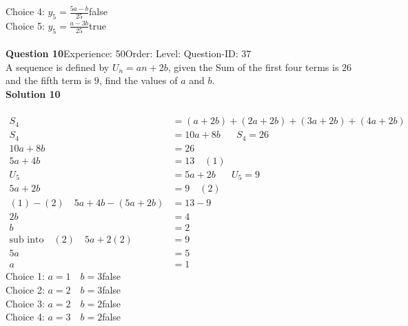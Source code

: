 \documentclass{article}
\begin{document}
Choice 4: \hspace{20pt}$y_5=\displaystyle\frac{5a-b}{25}$\hspace{20pt}false\\
Choice 5: \hspace{20pt}$y_5=\displaystyle\frac{a-3b}{25}$\hspace{20pt}true\\
\\[4pt]
\noindent\textbf{Question 10}\hspace{20pt}Experience: 50\hspace{20pt}Order: \hspace{20pt}Level: \hspace{20pt}Question-ID: 37\\[2pt]
A sequence is defined by $U_n=an+2b$, given the Sum of the first four terms is $26$ and the fifth term is $9$, find the values of $a$ and $b$.\\[4pt]
\noindent\textbf{Solution 10}\\[2pt]
\\[-35pt]\begin{align*}
S_4&=(a+2b)+(2a+2b)+(3a+2b)+(4a+2b)\\[2pt]
S_4&=10a+8b\hspace{20pt} S_4=26\\[2pt]
10a+8b&=26\\[2pt]
5a+4b&=13\quad (1)\\[12pt]
U_5&=5a+2b\hspace{20pt}U_5=9\\[2pt]
5a+2b&=9\quad (2)\\[12pt]
(1)-(2)\quad 5a+4b-(5a+2b)&=13-9\\[2pt]
2b&=4\\[2pt]
b&=2\\[12pt]
\text{sub into}\quad (2) \quad 5a+2(2)&=9\\[2pt]
5a&=5\\[2pt]
a&=1
\end{align*}
Choice 1: \hspace{20pt}$a=1\quad b=3$\hspace{20pt}false\\
Choice 2: \hspace{20pt}$a=2 \quad b=3$\hspace{20pt}false\\
Choice 3: \hspace{20pt}$a=2 \quad b=2$\hspace{20pt}false\\
Choice 4: \hspace{20pt}$a=3 \quad b=2$\hspace{20pt}false\\
\end{document}
